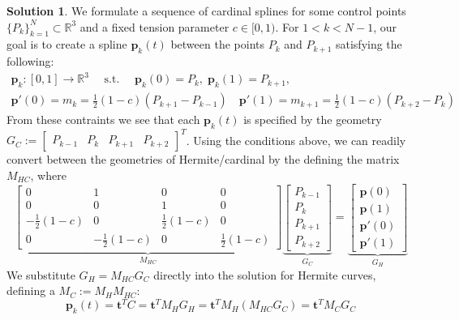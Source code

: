 \documentclass[10pt]{article}
\theoremstyle{plain}
\theoremstyle{definition}
\newtheorem*{soln*}{Solution}
\providecommand{\R}{\mathbb{R}}%
\numberwithin{equation}{section}
\providecommand{\st}{\text{ s.t. }}
\begin{document}
\begin{soln*}
    We formulate a sequence of cardinal splines for some control points
    $\{P_k\}_{k=1}^{N} \subset \R^3$ and
    a fixed tension parameter $c \in {[0,1)}$. For $ 1 < k < N-1$,
        our goal is to create a spline $\bm{p}_k(t)$ between the points
        $P_k$ and $P_{k+1}$ satisfying the following: 
    \begin{gather*}
    \bm{p}_k: {[0,1]} \rightarrow \R^3 \quad \st \quad
    \bm{p}_k(0) = P_k , \; \bm{p}_k(1) = P_{k+1} , \\
    \bm{p}'(0) = m_k = \frac{1}{2}(1-c)\left(P_{k+1} - P_{k-1}\right) \quad
    \bm{p}'(1) = m_{k+1} = \frac{1}{2}(1-c)\left(P_{k+2} - P_{k}\right) 
    \end{gather*}
    From these contraints we see that each $\bm{p}_k(t)$ is specified by the geometry
    $G_C := \begin{bmatrix} P_{k-1} & P_k & P_{k+1} & P_{k+2} \end{bmatrix}^T$.
    Using the conditions above, we can readily convert between the geometries
    of Hermite/cardinal by the defining the matrix $M_{HC}$, where
    \[
            \underbrace{\begin{bmatrix}
                0 & 1 & 0 & 0 \\
                0 & 0 & 1 & 0 \\
                -\frac{1}{2}(1-c) & 0 & \frac{1}{2}(1-c) & 0 \\
                0 & -\frac{1}{2}(1-c) & 0 & \frac{1}{2}(1-c)
                \end{bmatrix}}_{M_{HC}}
            \underbrace{
            \begin{bmatrix}
                P_{k-1} \\ P_k \\ P_{k+1} \\ P_{k+2}
        \end{bmatrix}}_{G_C}
            =
            \underbrace{
            \begin{bmatrix}
                \bm{p}(0) \\ \bm{p}(1) \\ \bm{p}'(0) \\ \bm{p}'(1)
        \end{bmatrix}}_{G_H}
        \]
    We substitute $G_H = M_{HC} G_C$ directly into the solution for Hermite curves, defining a
    $M_C := M_H M_{HC}$:
    \[
            \bm{p}_k(t) = \bm{t}^T C = \bm{t}^T M_H G_H = \bm{t}^T M_H (M_{HC} G_C )
                        = \bm{t}^T M_C G_C 
\]
\end{soln*}
\end{document}
